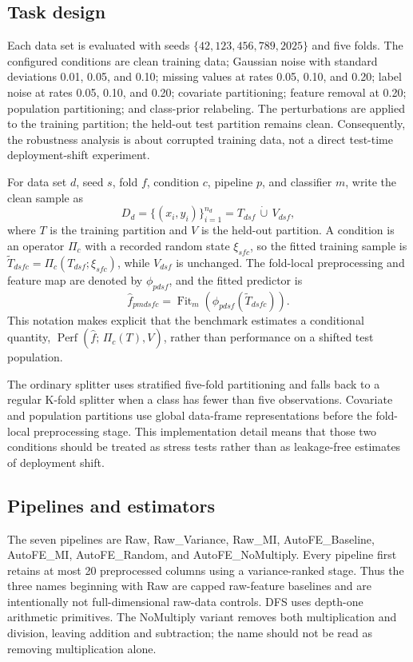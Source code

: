 \documentclass[preprint,12pt]{elsarticle}
\begin{document}
\subsection{Task design}
Each data set is evaluated with seeds $\{42,123,456,789,2025\}$ and five folds.  The configured conditions are clean training data; Gaussian noise with standard deviations 0.01, 0.05, and 0.10; missing values at rates 0.05, 0.10, and 0.20; label noise at rates 0.05, 0.10, and 0.20; covariate partitioning; feature removal at 0.20; population partitioning; and class-prior relabeling.  The perturbations are applied to the training partition; the held-out test partition remains clean.  Consequently, the robustness analysis is about corrupted training data, not a direct test-time deployment-shift experiment.

For data set $d$, seed $s$, fold $f$, condition $c$, pipeline $p$, and classifier $m$, write the clean sample as
\begin{equation}
  D_d=\{(x_i,y_i)\}_{i=1}^{n_d}=T_{d s f}\,\dot\cup\,V_{d s f},
\end{equation}
where $T$ is the training partition and $V$ is the held-out partition.  A condition is an operator $\Pi_c$ with a recorded random state $\xi_{sfc}$, so the fitted training sample is $\widetilde T_{d s f c}=\Pi_c(T_{d s f};\xi_{sfc})$, while $V_{d s f}$ is unchanged.  The fold-local preprocessing and feature map are denoted by $\phi_{p d s f}$, and the fitted predictor is
\begin{equation}
  \widehat f_{p m d s f c}=\operatorname{Fit}_{m}\!\left(\phi_{p d s f}(\widetilde T_{d s f c})\right).
\end{equation}
This notation makes explicit that the benchmark estimates a conditional quantity, $\operatorname{Perf}(\widehat f;\,\Pi_c(T),V)$, rather than performance on a shifted test population.

The ordinary splitter uses stratified five-fold partitioning and falls back to a regular K-fold splitter when a class has fewer than five observations.  Covariate and population partitions use global data-frame representations before the fold-local preprocessing stage.  This implementation detail means that those two conditions should be treated as stress tests rather than as leakage-free estimates of deployment shift.

\subsection{Pipelines and estimators}
The seven pipelines are Raw, Raw\_Variance, Raw\_MI, AutoFE\_Baseline, AutoFE\_MI, AutoFE\_Random, and AutoFE\_NoMultiply.  Every pipeline first retains at most 20 preprocessed columns using a variance-ranked stage.  Thus the three names beginning with Raw are capped raw-feature baselines and are intentionally not full-dimensional raw-data controls.  DFS uses depth-one arithmetic primitives.  The NoMultiply variant removes both multiplication and division, leaving addition and subtraction; the name should not be read as removing multiplication alone.
\end{document}
